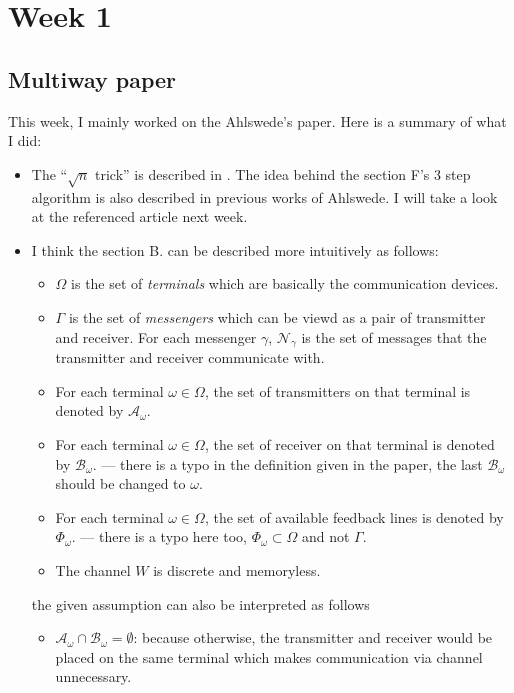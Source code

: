 \documentclass{article}
\begin{document}
\section{Week 1}
\subsection{Multiway paper}
This week, I mainly worked on the Ahlswede's \cite{multiway} paper. Here is a summary of what I did:
\begin{itemize}
	\item The ``\(\sqrt{n}\) trick'' is described in \cite{idfeedback}. The idea behind the section F's 3 step algorithm is also described in previous works of Ahlswede. I will take a look at the referenced article next week.
	\item I think the section B. can be described more intuitively as follows:
	      \begin{itemize}
		      \item \(\Omega\) is the set of \textit{terminals} which are basically the communication devices.
		      \item \(\Gamma\) is the set of \textit{messengers} which can be viewd as a pair of transmitter and receiver. For each messenger \(\gamma\), \(\mathcal{N}_{\gamma}\) is the set of messages that the transmitter and receiver communicate with.
		      \item For each terminal \(\omega \in \Omega\), the set of transmitters on that terminal is denoted by \(\mathcal{A}_{\omega}\).
		      \item For each terminal \(\omega \in \Omega\), the set of receiver on that terminal is denoted by \(\mathcal{B}_{\omega}\). --- there is a typo in the definition given in the paper, the last \(\mathcal{B}_{\omega}\) should be changed to \(\omega\).
		      \item For each terminal \(\omega \in \Omega\), the set of available feedback lines is denoted by \(\Phi_{\omega}\). --- there is a typo here too, \(\Phi_{\omega} \subset \Omega\) and not \(\Gamma\).
		      \item The channel \(W\) is discrete and memoryless.
	      \end{itemize}
	      the given assumption can also be interpreted as follows
	      \begin{itemize}
		      \item \(\mathcal{A}_{\omega} \cap \mathcal{B}_{\omega} = \emptyset\):
		            because otherwise, the transmitter and receiver would be placed on the same terminal which makes communication via channel unnecessary.


\end{itemize}
\end{itemize}
\end{document}
